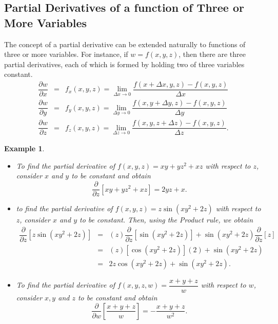 \documentclass[titlepage,a4paper,12pt]{report}
\newtheorem{example}{Example}[section]
\begin{document}
\subsection{Partial Derivatives of a function of Three or More Variables}
The concept of a partial derivative can be extended naturally to functions of three or more variables. For instance, if $w=f(x,y,z)$, then there are three partial derivatives, each of which is formed by holding two of three variables constant.
\begin{eqnarray*}
\dfrac{\partial w}{\partial x} &=& f_x(x,y,z)=\lim _{\Delta x \rightarrow 0} \dfrac{f(x+\Delta x, y, z)-f(x,y,z)}{\Delta x} \\
\dfrac{\partial w}{\partial y} &=& f_y(x,y,z)=\lim _{\Delta y \rightarrow 0} \dfrac{f(x,y+\Delta y, z)-f(x,y,z)}{\Delta y} \\
\dfrac{\partial w}{\partial z} &=& f_z(x,y,z)=\lim _{\Delta z \rightarrow 0} \dfrac{f(x,y,z+\Delta z)-f(x,y,z)}{\Delta z}.
\end{eqnarray*}
\begin{example}
\begin{itemize}
\item[(i)] To find the partial derivative of $f(x,y,z)=xy+yz^2+xz$ with respect to $z$, consider $x$ and $y$ to be constant and obtain 
\[\dfrac{\partial}{\partial z}\left[xy+yz^2+xz\right]=2yz+x.\]
\item[(ii)] to find the partial derivative of $f(x,y,z)=z\sin (xy^2+2z)$ with respect to $z$, consider $x$ and $y$ to be constant. Then, using the Product rule, we obtain
\begin{eqnarray*}
\dfrac{\partial}{\partial z}\left[z\sin (xy^2+2z)\right] &=& (z)\dfrac{\partial}{\partial z}[\sin (xy^2+2z)] +\sin (xy^2+2z)\dfrac{\partial}{\partial z} [z]\\
&=& (z)[\cos (xy^2+2z)](2) +\sin (xy^2+2z)\\
&=& 2z\cos (xy^2+2z)+\sin (xy^2+2z).
\end{eqnarray*}
\item[(iii)] To find the partial derivative of $f(x,y,z,w)=\dfrac{x+y+z}{w}$ with respect to $w$, consider $x,y$ and $z$ to be constant and obtain
\[\dfrac{\partial }{\partial w}\left[\dfrac{x+y+z}{w}\right]=-\dfrac{x+y+z}{w^2}.\]
\end{itemize}
\end{example}
\end{document}
